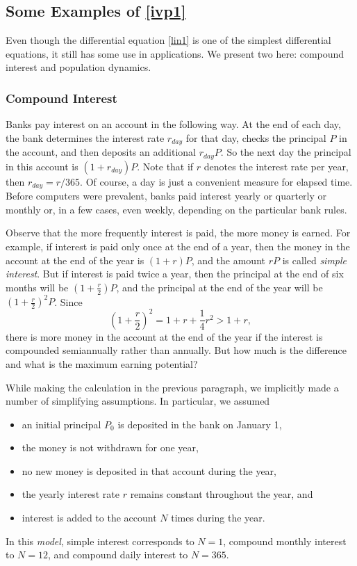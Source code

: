 \documentclass{ximera}
\begin{document}
\subsection*{Some Examples of \protect\eqref{ivp1}}

Even though the differential equation \eqref{lin1} is one of the
simplest differential equations, it still has some use in applications.
We present two here: compound interest and population dynamics.

\subsubsection*{Compound Interest} 

Banks pay interest on an account in the following way.  At the
end of each day, the bank determines the interest rate $r_{day}$ for
that day, checks the principal $P$ in the account, and then
deposits an additional $r_{day}P$.  So the next day the principal in
this account is $(1+r_{day})P$.  Note that if $r$ denotes the
interest rate per year, then $r_{day} = r/365$.  Of course, a day
is just a convenient measure for elapsed time.  Before computers
were prevalent, banks paid interest yearly or quarterly or monthly
or, in a few cases, even weekly, depending on the particular bank rules.

Observe that the more frequently interest is paid, the more
money is earned. For example, if interest is paid only once at
the end of a year, then the money in the account at the end of
the year is $(1+r)P$, and the amount $rP$ is called {\em simple
interest\/}.  But if interest is paid twice a year, then the principal
at the end of six months will be $(1+\frac{r}{2})P$, and the principal
at the end of the year will be $(1+\frac{r}{2})^2P$.  Since
\[
\left(1+\frac{r}{2}\right)^2 = 1+r+\frac{1}{4}r^2 > 1+r,
\]
there is more money in the account at the end of the
year if the interest is compounded semiannually rather than
annually.  But how much is the difference and what is the
maximum earning potential?

While making the calculation in the previous paragraph, we
implicitly made a number of simplifying assumptions.  In
particular, we assumed
\begin{itemize}
\item	an initial principal $P_0$ is deposited in the bank on January 1,
\item	the money is not withdrawn for one year,
\item	no new money is deposited in that account during the year,
\item	the yearly interest rate $r$ remains constant throughout
	the year, and
\item	interest is added to the account $N$ times during the year.
\end{itemize}
In this {\em model\/}, simple interest corresponds to $N=1$, compound monthly
interest to $N=12$, and compound daily interest to $N=365$.
\end{document}
